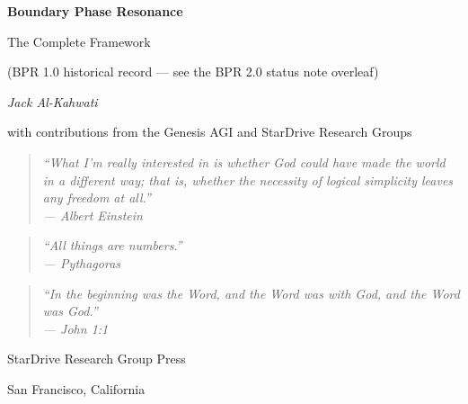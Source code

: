 \documentclass[12pt,oneside]{book}
\theoremstyle{definition}
\begin{document}
\frontmatter

\begin{titlepage}
  \centering\vspace*{1.2cm}
  {\Huge\bfseries Boundary Phase Resonance\par}\vspace{0.5cm}
  {\LARGE The Complete Framework\par}\vspace{0.4cm}
  {\normalsize (BPR 1.0 historical record --- see the BPR 2.0 status note overleaf)\par}\vspace{1.2cm}
  {\large\itshape Jack Al-Kahwati\par}\vspace{0.3cm}
  {\small with contributions from the Genesis AGI and StarDrive Research Groups\par}
  \vspace{2.4cm}
  \begin{quote}\centering\itshape
    ``What I'm really interested in is whether God could have made the world in a
    different way; that is, whether the necessity of logical simplicity leaves any
    freedom at all.''\\\upshape\small --- Albert Einstein
  \end{quote}\vspace{1cm}
  \begin{quote}\centering\itshape
    ``All things are numbers.''\\\upshape\small --- Pythagoras
  \end{quote}\vspace{0.8cm}
  \begin{quote}\centering\itshape
    ``In the beginning was the Word, and the Word was with God, and the Word was
    God.''\\\upshape\small --- John 1:1
  \end{quote}
  \vfill
  {\large StarDrive Research Group Press\par}
  {\normalsize San Francisco, California\par}\vspace{0.6cm}
\end{titlepage}
\end{document}
